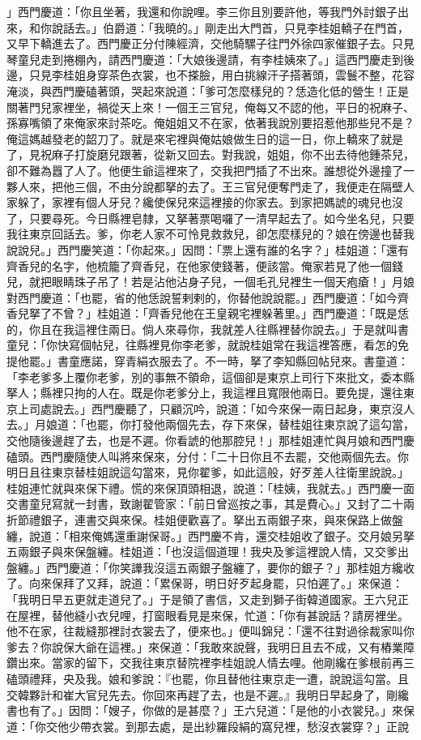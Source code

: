 」西門慶道：「你且坐著，我還和你說哩。李三你且別要許他，等我門外討銀子出來，和你說話去。」伯爵道：「我曉的。」剛走出大門首，只見李桂姐轎子在門首，又早下轎進去了。西門慶正分付陳經濟，交他騎騾子往門外徐四家催銀子去。只見琴童兒走到捲棚內，請西門慶道：「大娘後邊請，有李桂姨來了。」這西門慶走到後邊，只見李桂姐身穿茶色衣裳，也不搽臉，用白挑線汗子搭著頭，雲鬟不整，花容淹淡，與西門慶磕著頭，哭起來說道：「爹可怎麼樣兒的？恁造化低的營生！正是關著門兒家裡坐，禍從天上來！一個王三官兒，俺每又不認的他，平日的祝麻子、孫寡嘴領了來俺家來討茶吃。俺姐姐又不在家，依著我說別要招惹他那些兒不是？俺這媽越發老的韶刀了。就是來宅裡與俺姑娘做生日的這一日，你上轎來了就是了，見祝麻子打旋磨兒跟著，從新又回去。對我說，姐姐，你不出去待他鍾茶兒，卻不難為囂了人了。他便生爺這裡來了，交我把門插了不出來。誰想從外邊撞了一夥人來，把他三個，不由分說都拏的去了。王三官兒便奪門走了，我便走在隔壁人家躲了，家裡有個人牙兒？纔使保兒來這裡接的你家去。到家把媽諕的魂兒也沒了，只要尋死。今日縣裡皂隸，又拏著票喝囉了一清早起去了。如今坐名兒，只要我往東京回話去。爹，你老人家不可怜見救救兒，卻怎麼樣兒的？娘在傍邊也替我說說兒。」西門慶笑道：「你起來。」因問：「票上還有誰的名字？」桂姐道：「還有齊香兒的名字，他梳籠了齊香兒，在他家使錢著，便該當。俺家若見了他一個錢兒，就把眼睛珠子吊了！若是沾他沾身子兒，一個毛孔兒裡生一個天疱瘡！」月娘對西門慶道：「也罷，省的他恁說誓剌剌的，你替他說說罷。」西門慶道：「如今齊香兒拏了不曾？」桂姐道：「齊香兒他在王皇親宅裡躲著里。」西門慶道：「既是恁的，你且在我這裡住兩日。倘人來尋你，我就差人往縣裡替你說去。」于是就叫書童兒：「你快寫個帖兒，往縣裡見你李老爹，就說桂姐常在我這裡答應，看怎的免提他罷。」書童應諾，穿青絹衣服去了。不一時，拏了李知縣回帖兒來。書童道：「李老爹多上覆你老爹，別的事無不領命，這個卻是東京上司行下來批文，委本縣拏人；縣裡只拘的人在。既是你老爹分上，我這裡且寬限他兩日。要免提，還往東京上司處說去。」西門慶聽了，只顧沉吟，說道：「如今來保一兩日起身，東京沒人去。」月娘道：「也罷，你打發他兩個先去，存下來保，替桂姐往東京說了這勾當，交他隨後邊趕了去，也是不遲。你看諕的他那腔兒！」那桂姐連忙與月娘和西門慶磕頭。西門慶隨使人叫將來保來，分付：「二十日你且不去罷，交他兩個先去。你明日且往東京替桂姐說這勾當來，見你翟爹，如此這般，好歹差人往衛里說說。」桂姐連忙就與來保下禮。慌的來保頂頭相退，說道：「桂姨，我就去。」西門慶一面交書童兒寫就一封書，致謝翟管家：「前日曾巡按之事，其是費心。」又封了二十兩折節禮銀子，連書交與來保。桂姐便歡喜了。拏出五兩銀子來，與來保路上做盤纏，說道：「相來俺媽還重謝保哥。」西門慶不肯，還交桂姐收了銀子。交月娘另拏五兩銀子與來保盤纏。桂姐道：「也沒這個道理！我央及爹這裡說人情，又交爹出盤纏。」西門慶道：「你笑譁我沒這五兩銀子盤纏了，要你的銀子？」那桂姐方纔收了。向來保拜了又拜，說道：「累保哥，明日好歹起身罷，只怕遲了。」來保道：「我明日早五更就走道兒了。」于是領了書信，又走到獅子街韓道國家。王六兒正在屋裡，替他縫小衣兒哩，打窗眼看見是來保，忙道：「你有甚說話？請房裡坐。他不在家，往裁縫那裡討衣裳去了，便來也。」便叫錦兒：「還不往對過徐裁家叫你爹去？你說保大爺在這裡。」來保道：「我敢來說聲，我明日且去不成，又有樁業障鑽出來。當家的留下，交我往東京替院裡李桂姐說人情去哩。他剛纔在爹根前再三磕頭禮拜，央及我。娘和爹說：『也罷，你且替他往東京走一遭，說說這勾當。且交韓夥計和崔大官兒先去。你回來再趕了去，也是不遲。』我明日早起身了，剛纔書也有了。」因問：「嫂子，你做的是甚麼？」王六兒道：「是他的小衣裳兒。」來保道：「你交他少帶衣裳。到那去處，是出紗羅段絹的窩兒裡，愁沒衣裳穿？」正說